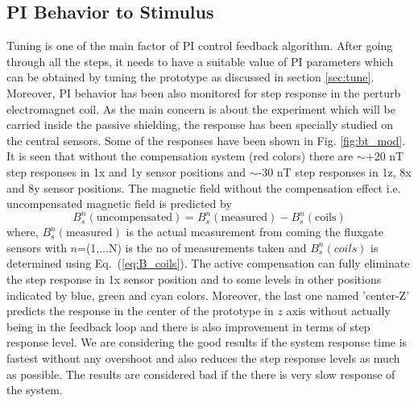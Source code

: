 \subsection{PI Behavior to Stimulus}


Tuning is one of the main factor of PI control feedback algorithm. After going through all the steps, it needs to have a suitable value of PI parameters which can be obtained by tuning the prototype as discussed in section \ref{sec:tune}. Moreover, PI behavior has been also monitored for step response in the perturb electromagnet coil. As the main concern is about the experiment which will be carried inside the passive shielding, the response has been specially studied on the central sensors. Some of the responses have been shown in Fig. \ref{fig:bt_mod}. It is seen that without the compensation system (red colors) there are $\sim$+20 nT step responses in  1x and 1y sensor positions and $\sim$-30 nT step responses in 1z, 8x and 8y sensor positions. The magnetic field without the compensation effect i.e. uncompensated magnetic field is predicted by
\begin{equation}\label{eq:Buncomp}
     B_s^n(\text{uncompensated})=B_s^n(\text{measured})- B_s^n(\text{coils})
\end{equation}
where, $B_s^n(\text{measured})$ is the actual measurement from coming the fluxgate sensors with $n$=(1,...N) is the no of measurements taken and $B_s^n(coils)$ is determined using Eq.~(\ref{eq:B_coils}). The active compensation can fully eliminate the step response in 1x sensor position and to some levels in other positions indicated by blue, green and cyan colors. Moreover, the last one named 'center-Z' predicts the response in the center of the prototype in $z$ axis without actually being in the feedback loop and there is also improvement in terms of step response level. We are considering the good results if the system response time is fastest without any overshoot and also reduces the step response levels as much as possible. The results are considered bad if the there is very slow response of the system.


